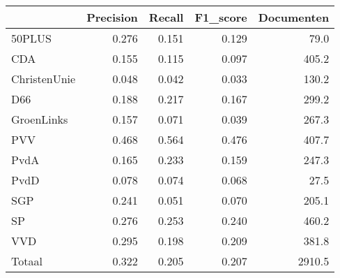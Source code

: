 \begin{tabular}{lrrrr}
\toprule
{} &  Precision &  Recall &  F1\_score &  Documenten \\
\midrule
50PLUS       &      0.276 &   0.151 &     0.129 &        79.0 \\
   CDA       &      0.155 &   0.115 &     0.097 &       405.2 \\
ChristenUnie &      0.048 &   0.042 &     0.033 &       130.2 \\
   D66       &      0.188 &   0.217 &     0.167 &       299.2 \\
  GroenLinks &      0.157 &   0.071 &     0.039 &       267.3 \\
   PVV       &      0.468 &   0.564 &     0.476 &       407.7 \\
  PvdA       &      0.165 &   0.233 &     0.159 &       247.3 \\
  PvdD       &      0.078 &   0.074 &     0.068 &        27.5 \\
   SGP       &      0.241 &   0.051 &     0.070 &       205.1 \\
    SP       &      0.276 &   0.253 &     0.240 &       460.2 \\
   VVD       &      0.295 &   0.198 &     0.209 &       381.8 \\
Totaal       &      0.322 &   0.205 &     0.207 &      2910.5 \\
\bottomrule
\end{tabular}
